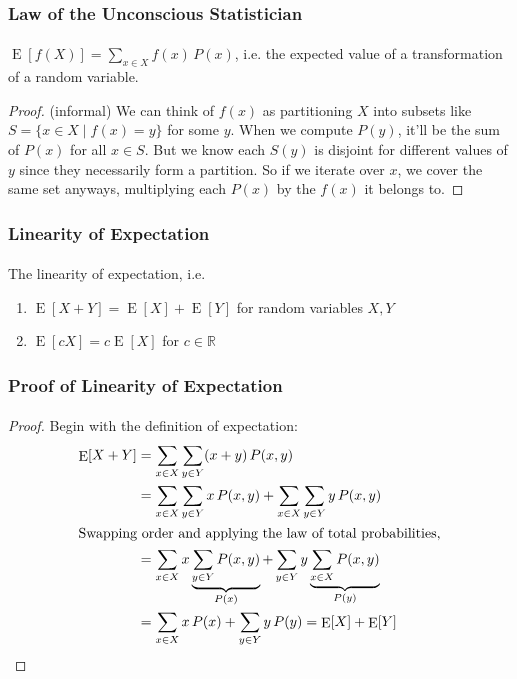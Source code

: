 \documentclass{beamer}                             %
\DeclareMathOperator{\E}{E}
\begin{document}
\begin{frame}
\frametitle{Law of the Unconscious Statistician}
\framesubtitle{}
\begin{theorem}
  \( \E[f(X)] = \sum_{x \in X} f(x) \, P(x) \), i.e. the expected value of a
  transformation of a random variable.
\end{theorem}
\begin{proof}
  (informal) We can think of \( f(x) \) as partitioning \( X \) into
  subsets like \( S = \{ x \in X \mid f(x) = y \} \) for some \( y \).
  When we compute \( P(y) \), it'll be the sum of \( P(x) \) for all
  \( x \in S \). But we know each \( S(y) \) is disjoint for different
  values of \( y \) since they necessarily form a partition. So if we
  iterate over \( x \), we cover the same set anyways, multiplying each
  \( P(x) \) by the \( f(x) \) it belongs to.
\end{proof}
\end{frame}

\begin{frame}
\frametitle{Linearity of Expectation}
\framesubtitle{}
\begin{corollary}
  The linearity of expectation, i.e.
  \begin{enumerate}
    \item \( \E[X + Y] = \E[X] + \E[Y] \) for random variables \(X, Y\) 
    \item \( \E[cX] = c\E[X] \) for \( c \in \mathbb{R} \)
  \end{enumerate}
\end{corollary}
\end{frame}

\begin{frame}
\frametitle{Proof of Linearity of Expectation}
\framesubtitle{}
\begin{proof}
  Begin with the definition of expectation:
  \begin{align*}  
    \E[X + Y] &= \sum_{x \in X} \sum_{y \in Y} (x + y) \, P(x, y) \\
              &= \sum_{x \in X} \sum_{y \in Y} x \, P(x, y) +
                 \sum_{x \in X} \sum_{y \in Y} y \, P(x, y) \\
    \shortintertext{Swapping order and applying the law of total probabilities,}
              &= \sum_{x \in X} x \underbrace{\sum_{y \in Y} P(x, y)}_{P(x)} + 
                 \sum_{y \in Y} y \underbrace{\sum_{x \in X} P(x, y)}_{P(y)} \\
              &= \sum_{x \in X} x \, P(x) + \sum_{y \in Y} y \, P(y)
               = \E[X] + \E[Y]
  \end{align*}
  \let\qedsymbol\relax
\end{proof}
\end{frame}
\end{document}
